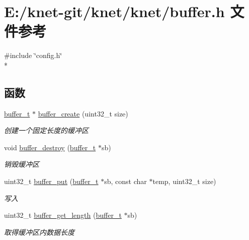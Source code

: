 \hypertarget{a00038}{}\section{E\+:/knet-\/git/knet/knet/buffer.h 文件参考}
\label{a00038}
{\ttfamily \#include \char`\"{}config.\+h\char`\"{}}\\*
\subsection*{函数}
\begin{DoxyCompactItemize}
\item 
\hyperlink{a00044_aad99a77d28bd81d3d36d0ea569c9482d_aad99a77d28bd81d3d36d0ea569c9482d}{buffer\+\_\+t} $\ast$ \hyperlink{a00038_aa5059c5ab47dd3f98ce1d208831dfb88_aa5059c5ab47dd3f98ce1d208831dfb88}{buffer\+\_\+create} (uint32\+\_\+t size)
\begin{DoxyCompactList}\small\item\em 创建一个固定长度的缓冲区 \end{DoxyCompactList}\item 
void \hyperlink{a00038_a75b1ca3205331cdaf7a9f4e6f28c03d9_a75b1ca3205331cdaf7a9f4e6f28c03d9}{buffer\+\_\+destroy} (\hyperlink{a00044_aad99a77d28bd81d3d36d0ea569c9482d_aad99a77d28bd81d3d36d0ea569c9482d}{buffer\+\_\+t} $\ast$sb)
\begin{DoxyCompactList}\small\item\em 销毁缓冲区 \end{DoxyCompactList}\item 
uint32\+\_\+t \hyperlink{a00038_ab3e5b8fef4f96fbba03bcd2a55d5c4e2_ab3e5b8fef4f96fbba03bcd2a55d5c4e2}{buffer\+\_\+put} (\hyperlink{a00044_aad99a77d28bd81d3d36d0ea569c9482d_aad99a77d28bd81d3d36d0ea569c9482d}{buffer\+\_\+t} $\ast$sb, const char $\ast$temp, uint32\+\_\+t size)
\begin{DoxyCompactList}\small\item\em 写入 \end{DoxyCompactList}\item 
uint32\+\_\+t \hyperlink{a00038_a521aa1247c7e0ce15f48da2b3f87ede5_a521aa1247c7e0ce15f48da2b3f87ede5}{buffer\+\_\+get\+\_\+length} (\hyperlink{a00044_aad99a77d28bd81d3d36d0ea569c9482d_aad99a77d28bd81d3d36d0ea569c9482d}{buffer\+\_\+t} $\ast$sb)
\begin{DoxyCompactList}\small\item\em 取得缓冲区内数据长度 \end{DoxyCompactList}\item 

\end{DoxyCompactItemize}
